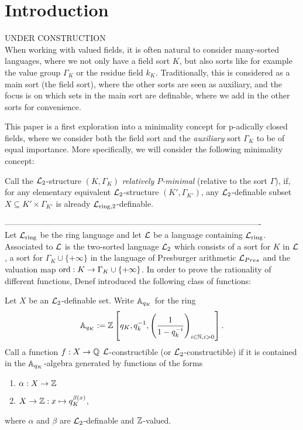 \section{Introduction}
UNDER CONSTRUCTION\\
When working with valued fields, it is often natural to consider many-sorted languages, where we not only have a field sort $K$, but also sorts like for example the value group $\Gamma_K$ or the residue field $k_K$. Traditionally, this is considered as a main sort (the field sort), where the other sorts are seen as auxiliary, and the focus is on which sets in the main sort are definable, where we add in the other sorts for convenience.

This paper is a first exploration into a minimality concept for p-adically closed fields, where we consider both the field sort and the \emph{auxiliary} sort $\Gamma_K$ to be of equal importance. More specifically, we will consider the following minimality concept: 

\begin{defn}
Call the $\Lm_2$-structure $(K,\Gamma_K)$ \emph{relatively $P$-minimal} (relative to the sort $\Gamma$), if, for any elementary equivalent $\Lm_2$-structure $(K',\Gamma_{K'})$, any $\Lm_2$-definable subset $X\subseteq K'\times \Gamma_{K'}$ is already $\cL_{\rm ring, 2}$-definable.
\end{defn}
----------------------------------------------------------------------------------------------\\
Let $\cL_{\rm ring}$ be the ring language and let $\cL$ be a language containing $\cL_{\rm ring}$. Associated to $\cL$ is the two-sorted language $\cL_2$ which consists of a sort for $K$ in $\cL$, a sort for $\Gamma_K\cup\{+\infty\}$ in the language of Presburger arithmetic $\cL_{Pres}$ and the valuation map $\ord: K\to \Gamma_K\cup\{+\infty\}$. In order to prove the rationality of different functions, Denef introduced the following class of functions: 

\begin{defn}
Let $X$ be an $\cL_2$-definable set. Write $\AA_{q_K}$ for the ring \[\AA_{q_K}:=\ZZ\left[q_K, q_k^{-1}, \left(\frac1{1-q_k^{-i}}\right)_{i\in \NN, i>0}\right].\]
Call a function $f:X\to \QQ$ $\cL$-constructible (or $\cL_2$-constructible) if it is contained in the $\AA_{q_K}$-algebra generated by functions of the forms
\begin{enumerate}
\item $\alpha:X\to \ZZ$
\item $X\to \ZZ:x\mapsto q_K^{\beta(x)}$,
\end{enumerate}
where $\alpha$ and $\beta$ are $\cL_2$-definable and $\ZZ$-valued.  
\end{defn}

